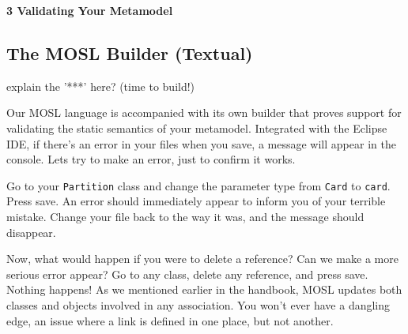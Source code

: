 \newpage
\texHeader

{\bf \Large 3 \hspace{0.5cm}Validating Your Metamodel}

\subsection{ The MOSL Builder (Textual)}

{\scriptsize explain the '***' here? (time to build!)}

\hypertarget{validation tex}{} Our MOSL language is accompanied with its own builder that proves support for validating the static semantics of your metamodel.
Integrated with the Eclipse IDE, if there's an error in your files when you save, a message will appear in the console. Lets try to make an error, just to
confirm it works.

Go to your \texttt{Partition} class and change the parameter type from \texttt{Card} to \texttt{card}. Press save. An error should immediately appear to inform
you of your terrible mistake. Change your file back to the way it was, and the message should disappear.

Now, what would happen if you were to delete a reference? Can we make a more serious error appear? Go to any class, delete any reference, and press save.
Nothing happens! As we mentioned earlier in the handbook, MOSL updates both classes and objects involved in any association. You won't ever have a dangling
edge, an issue where a link is defined in one place, but not another.

